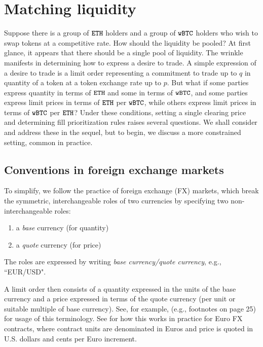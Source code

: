 \documentclass[11pt, reqno]{amsart}
\theoremstyle{definition}
\theoremstyle{remark}
\newcommand{\BTC}{\textnormal{\texttt{wBTC}}}
\newcommand{\ETH}{\textnormal{\texttt{ETH}}}
\begin{document}
\section{Matching liquidity}
Suppose there is a group of $\ETH$ holders and a group of $\BTC$ holders who
wish to swap tokens at a competitive rate.
How should the liquidity be pooled? At first glance, it appears that
there should be a single pool of liquidity. The wrinkle manifests in determining
how to express a desire to trade. A simple expression of a desire to trade is
a limit order representing a commitment to trade up to $q$ in quantity of
a token at a token exchange rate up to $p$. But what if some parties express
quantity in terms of $\ETH$ and some in terms of $\BTC$, and some parties
express limit prices in terms of $\ETH$ per $\BTC$, while others express limit
prices in terms of $\BTC$ per $\ETH$? Under these conditions, setting a single
clearing price and determining fill prioritization rules raises several
questions. We shall consider and address these in the sequel, but to begin, we
discuss a more constrained setting, common in practice.

\subsection{Conventions in foreign exchange markets}
To simplify, we follow the practice of foreign exchange (FX) markets,
which break the symmetric, interchangeable roles of two currencies by
specifying two non-interchangeable roles:
\begin{enumerate}
	\item a \emph{base} currency (for quantity)
	\item a \emph{quote} currency (for price)
\end{enumerate}
The roles are expressed by writing \emph{base currency/quote currency}, e.g.,
``EUR/USD".

A limit order then consists of a quantity expressed in the units of the base
currency and a price expressed in terms of the quote currency (per unit or
suitable multiple of base currency). See, for example, \cite{Cme23} (e.g.,
footnotes on page 25) for usage of this terminology. See \cite{CmeFx} for how
this works in practice for Euro FX contracts, where contract units are
denominated in Euros and price is quoted in U.S. dollars and cents per Euro
increment.
\end{document}
